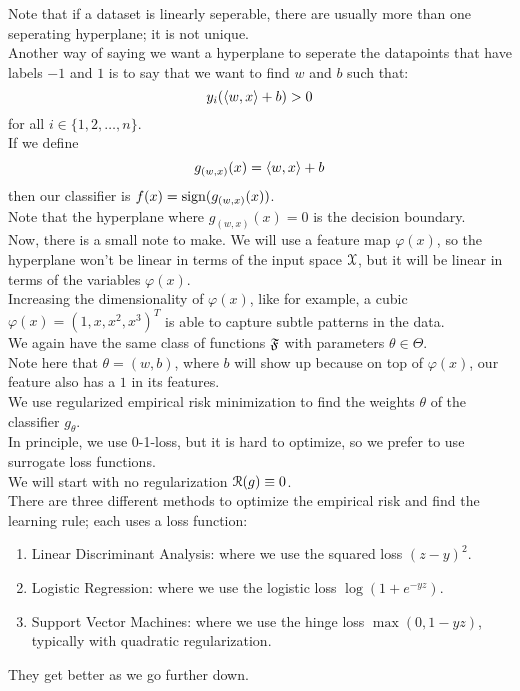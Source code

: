 \documentclass[12pt]{article}
\begin{document}
Note that if a dataset is linearly seperable,
there are usually more than one seperating hyperplane;
it is not unique. \\

Another way of saying we want a hyperplane
to seperate the datapoints that have labels
$-1$ and $1$ is to say that we want to find
$w$ and $b$ such that:
\[ y_i(\left\langle w, x \right\rangle + b) > 0 \]
for all $i \in \{1, 2, \dots, n\}$. \\

If we define 
\[ g_{(w, x)}(x) = \left\langle w, x \right\rangle + b \]
then our classifier is $f(x) = \text{sign}(g_{(w, x)}(x))$. \\
Note that the hyperplane where $g_{(w, x)}(x) = 0$
is the decision boundary. \\

Now, there is a small note to make.
We will use a feature map $\varphi(x)$,
so the hyperplane won't be linear in terms of
the input space $\mathcal{X}$,
but it will be linear in terms of the
variables $\varphi(x)$. \\

Increasing the dimensionality of $\varphi(x)$,
like for example,
a cubic $\varphi(x) = (1, x, x^2, x^3)^T$
is able to capture subtle patterns in the data. \\

We again have the same class of functions $\mathfrak{F}$
with parameters $\theta \in \Theta$. \\

Note here that $\theta = (w, b)$,
where $b$ will show up because on top of 
$\varphi(x)$, our feature also has a $1$ 
in its features. \\

We use regularized empirical risk minimization
to find the weights $\theta$ of the classifier $g_\theta$. \\

In principle, we use 0-1-loss, but it is hard to
optimize, so we prefer to use surrogate loss functions. \\

We will start with no regularization $\mathcal{R}(g) \equiv 0$. \\

There are three different methods to optimize
the empirical risk and find the learning rule;
each uses a loss function:
\begin{enumerate}
    \item 
    Linear Discriminant Analysis:
    where we use the squared loss $(z - y)^2$.
    \item 
    Logistic Regression:
    where we use the logistic loss $\log(1+e^{-yz})$.
    \item 
    Support Vector Machines:
    where we use the hinge loss $\max(0, 1-yz)$,
    typically with quadratic regularization.
\end{enumerate}
They get better as we go further down. \\
\end{document}
